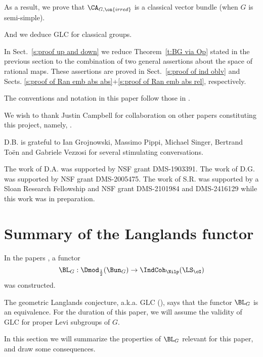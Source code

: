 \documentclass[9pt]{amsart}
\theoremstyle{remark}
\theoremstyle{definition}
\theoremstyle{remark}
\newcommand{\thmref}[1]{Theorem~\ref{#1}}
\newcommand{\secref}[1]{Sect.~\ref{#1}}
\numberwithin{equation}{section}
\begin{document}
As a result, we prove that $\CA_{G,\on{irred}}$ is a classical vector bundle (when $G$ is semi-simple).

\medskip

And we deduce GLC for classical groups. 

\sssec{}

In \secref{s:proof up and down} we reduce \thmref{t:BG via Op} stated in the previous section to the combination
of two general assertions about the space of rational maps. These assertions are proved in \secref{s:proof of ind oblv} and Sects. 
\ref{s:proof of Ran emb abs abs}+\ref{s:proof of Ran emb abs rel}, respectively. 


The conventions and notation in this paper follow those in \cite{GLC3}. 


We wish to thank Justin Campbell for collaboration on other papers constituting this 
project, namely, \cite{GLC2,GLC3}. 

\medskip

D.B. is grateful to Ian Grojnowski, Massimo Pippi, Michael Singer, Bertrand To\"en and Gabriele Vezzosi for several stimulating conversations.

\medskip

The work of D.A. was supported by NSF grant DMS-1903391.
The work of D.G. was supported by NSF grant DMS-2005475. 
The work of S.R. was supported by a Sloan Research Fellowship and NSF grant DMS-2101984 and DMS-2416129 while this work was in preparation.

\section{Summary of the Langlands functor} \label{s:summary}

In the papers \cite{GLC1}, a functor
$$\BL_G:\Dmod_{\frac{1}{2}}(\Bun_G)\to \IndCoh_\Nilp(\LS_\cG)$$
was constructed.

\medskip

The geometric Langlands conjecture, a.k.a. GLC (\cite[Conjecture 1.6.7]{GLC1}), says that the functor $\BL_G$ is an equivalence. 
For the duration of this paper, we will assume the validity of GLC for proper Levi subgroups of $G$. 

\medskip

In this section we will summarize the properties of $\BL_G$ relevant for this paper, and draw some consequences. 
\end{document}
